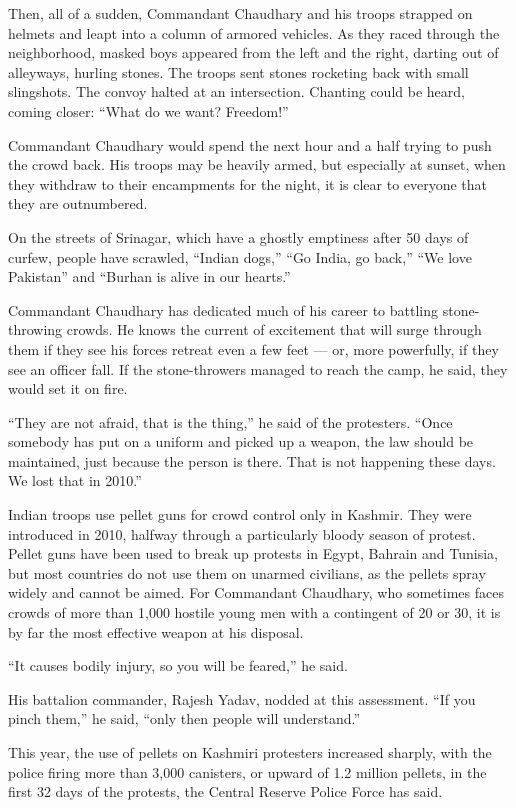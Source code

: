 Then, all of a sudden, Commandant Chaudhary and his troops strapped on
helmets and leapt into a column of armored vehicles. As they raced
through the neighborhood, masked boys appeared from the left and the
right, darting out of alleyways, hurling stones. The troops sent stones
rocketing back with small slingshots. The convoy halted at an
intersection. Chanting could be heard, coming closer: ``What do we want?
Freedom!''

Commandant Chaudhary would spend the next hour and a half trying to push
the crowd back. His troops may be heavily armed, but especially at
sunset, when they withdraw to their encampments for the night, it is
clear to everyone that they are outnumbered.

On the streets of Srinagar, which have a ghostly emptiness after 50 days
of curfew, people have scrawled, ``Indian dogs,'' ``Go India, go back,''
``We love Pakistan'' and ``Burhan is alive in our hearts.''

Commandant Chaudhary has dedicated much of his career to battling
stone-throwing crowds. He knows the current of excitement that will
surge through them if they see his forces retreat even a few feet ---
or, more powerfully, if they see an officer fall. If the stone-throwers
managed to reach the camp, he said, they would set it on fire.

``They are not afraid, that is the thing,'' he said of the protesters.
``Once somebody has put on a uniform and picked up a weapon, the law
should be maintained, just because the person is there. That is not
happening these days. We lost that in 2010.''

Indian troops use pellet guns for crowd control only in Kashmir. They
were introduced in 2010, halfway through a particularly bloody season of
protest. Pellet guns have been used to break up protests in Egypt,
Bahrain and Tunisia, but most countries do not use them on unarmed
civilians, as the pellets spray widely and cannot be aimed. For
Commandant Chaudhary, who sometimes faces crowds of more than 1,000
hostile young men with a contingent of 20 or 30, it is by far the most
effective weapon at his disposal.

``It causes bodily injury, so you will be feared,'' he said.

His battalion commander, Rajesh Yadav, nodded at this assessment. ``If
you pinch them,'' he said, ``only then people will understand.''

This year, the use of pellets on Kashmiri protesters increased sharply,
with the police firing more than 3,000 canisters, or upward of 1.2
million pellets, in the first 32 days of the protests, the Central
Reserve Police Force has said.

